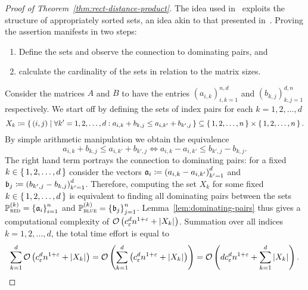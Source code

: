 \begin{proof}[Proof of Theorem~\ref{thm:rect-distance-product}]
    The idea used in~\cite{Chan2007} exploits the structure of appropriately sorted sets, an idea akin to that presented in~\cite{Dobosiewicz2007}.
    Proving the assertion manifests in two steps:
    \begin{enumerate}
        \item Define the sets and observe the connection to dominating pairs, and
        \item calculate the cardinality of the sets in relation to the matrix sizes.
    \end{enumerate}

    Consider the matrices $A$ and $B$ to have the entries ${(a_{i, k})}_{i, k = 1}^{n, d}$ and ${(b_{k, j})}_{k, j = 1}^{d, n}$ respectively.
    We start off by defining the sets of index pairs for each $k = 1, 2, \dots, d$
    \[
        X_k \coloneqq \left\{\,(i, j)\mid\forall k' = 1, 2, \dots, d: a_{i, k} + b_{k, j} \leq a_{i, k'} + b_{k', j}\,\right\} \subseteq \left\{\,1, 2, \dots, n\,\right\} \times \left\{\,1, 2, \dots, n\,\right\}.
    \]
    By simple arithmetic manipulation we obtain the equivalence
    \begin{equation}\label{eq:dominating-pair-inequality}
        a_{i, k} + b_{k, j} \leq a_{i, k'} + b_{k', j} \iff a_{i, k} - a_{i, k'} \leq b_{k', j} - b_{k, j}.
    \end{equation}
    The right hand term portrays the connection to dominating pairs: for a fixed $k \in \left\{\,1, 2, \dots, d\,\right\}$ consider the vectors $\mathfrak{a}_i \coloneqq {(a_{i, k} - a_{i, k'})}_{k' = 1}^d$ and $\mathfrak{b}_j \coloneqq {(b_{k', j} - b_{k, j})}_{k' = 1}^d$.
    Therefore, computing the set $X_k$ for some fixed $k \in \left\{\,1, 2, \dots, d\,\right\}$ is equivalent to finding all dominating pairs between the sets $\mathbb{P}_{\textsc{red}}^{(k)} = {\{ \mathfrak{a}_i \}}_{i = 1}^n$ and $\mathbb{P}_{\textsc{blue}}^{(k)} = {\{ \mathfrak{b}_j \}}_{j = 1}^n$.
    Lemma~\ref{lem:dominating-pairs} thus gives a computational complexity of $\mathcal{O}\left( c_\varepsilon^d n^{1 + \varepsilon} + \left\lvert X_k\right\rvert_{} \right)$.
    Summation over all indices $k = 1, 2, \dots, d$, the total time effort is equal to
    \[
        \sum\limits_{k = 1}^d \mathcal{O}\left( c_\varepsilon^d n^{1 + \varepsilon} + \left\lvert X_k\right\rvert_{} \right) = \mathcal{O}\left( \sum\limits_{k = 1}^d \left( c_\varepsilon^d n^{1 + \varepsilon} + \left\lvert X_k\right\rvert_{} \right) \right) = \mathcal{O}\left( d c_\varepsilon^d n^{1 + \varepsilon} + \sum\limits_{k = 1}^d \left\lvert X_k\right\rvert_{} \right).
    \]


\end{proof}
